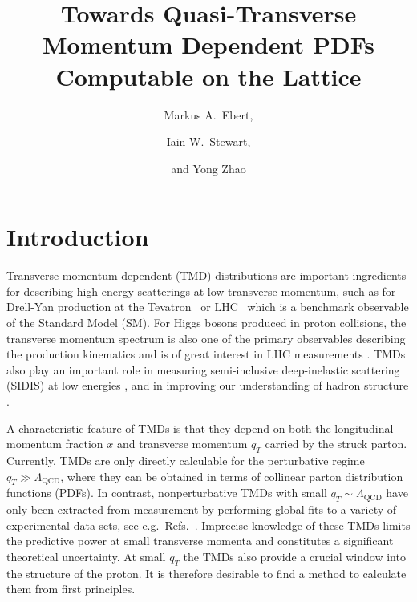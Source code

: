 \documentclass[11pt,a4paper]{article}
\title{Towards Quasi-Transverse Momentum Dependent PDFs Computable on the Lattice}
\author{Markus A.~Ebert,}
\author{Iain W.~Stewart,}
\author{and Yong Zhao}
\affiliation{Center for Theoretical Physics, Massachusetts Institute of Technology, Cambridge, Massachusetts 02139, USA}
\DeclareRobustCommand{\mycites}[1]{Refs.~\cite{#1}}
\newcommand{\LQCD}{\Lambda_\mathrm{QCD}}
\begin{document}
\maketitle


\section{Introduction}


Transverse momentum dependent (TMD) distributions are important ingredients for describing high-energy scatterings at low transverse momentum, such as for Drell-Yan production at the Tevatron~\cite{Affolder:1999jh,Abbott:1999yd,Abazov:2007ac,Abazov:2010kn} or LHC~\cite{Aad:2011gj,Chatrchyan:2011wt, Aad:2014xaa, Khachatryan:2015oaa, Aad:2015auj,  Khachatryan:2016nbe} which is a benchmark observable of the Standard Model (SM).
For Higgs bosons produced in proton collisions, the transverse momentum spectrum is also one of the primary observables describing the production kinematics and is of great interest in LHC measurements \cite{Aad:2014lwa,Aad:2014tca,Aad:2016lvc,Aaboud:2017oem,Aaboud:2018xdt,Khachatryan:2015rxa,Khachatryan:2015yvw,Khachatryan:2016vnn,Sirunyan:2018kta}.
TMDs also play an important role in measuring semi-inclusive deep-inelastic scattering (SIDIS) at low energies \cite{Ashman:1991cj,Derrick:1995xg,Adloff:1996dy,Aaron:2008ad,Airapetian:2012ki,Adolph:2013stb,Aghasyan:2017ctw},
and in improving our understanding of hadron structure \cite{Boer:2011fh,Accardi:2012qut}.

A characteristic feature of TMDs is that they depend on both the longitudinal momentum fraction $x$ and transverse momentum $q_T$ carried by the struck parton.  Currently, TMDs are only directly calculable for the perturbative regime $q_T\gg \LQCD$, %
where they can be obtained in terms of collinear parton distribution functions (PDFs). In contrast, nonperturbative TMDs with small $q_T\sim \LQCD$ have only been extracted from measurement by performing global fits to a variety of experimental data sets, see e.g.~\mycites{Landry:1999an,Landry:2002ix,Konychev:2005iy,DAlesio:2014mrz,Bacchetta:2017gcc,Scimemi:2017etj}.
Imprecise knowledge of these TMDs limits the predictive power at small transverse momenta and constitutes a significant theoretical uncertainty. At small $q_T$ the TMDs also provide a crucial window into the structure of the proton. It is therefore desirable to find a method to calculate them from first principles.
\end{document}
